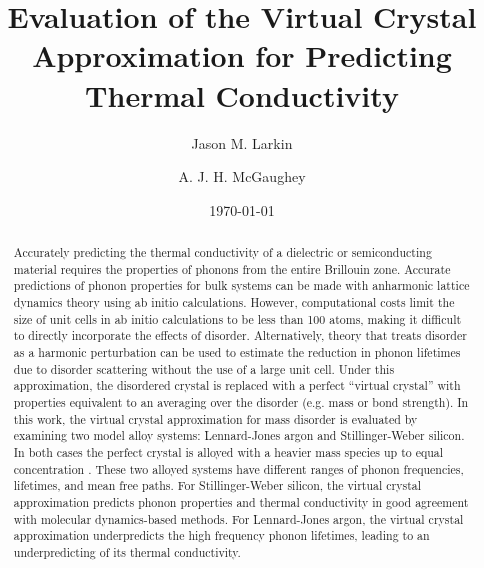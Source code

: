 \documentclass[aps,prb,twocolumn,superscriptaddress,preprintnumbers,amsmath,amssymb,floatfix]{revtex4}
\begin{document}

\title{Evaluation of the Virtual Crystal Approximation for Predicting 
Thermal Conductivity}
\author{Jason M. Larkin}
\author{A. J. H. McGaughey}

\date{\today}


\begin{abstract}
Accurately predicting the thermal conductivity of a dielectric or 
semiconducting material requires the properties of phonons from the entire 
Brillouin zone. Accurate predictions of phonon properties for bulk systems 
can be made with anharmonic lattice dynamics theory using ab initio 
calculations. However, computational costs limit the size of unit cells 
in ab initio calculations to be less than 100 atoms, making it difficult 
to directly incorporate the effects of disorder. Alternatively, theory 
that treats disorder as a harmonic perturbation can be used to estimate 
the reduction in phonon lifetimes due to disorder scattering without 
the use of a large unit cell. Under this approximation, the disordered
 crystal is replaced with a perfect “virtual crystal” with properties 
equivalent to an averaging over the disorder (e.g.  mass or bond 
strength). 
In this work, the virtual crystal approximation for mass disorder is 
evaluated by examining two model alloy systems: Lennard-Jones argon 
and Stillinger-Weber silicon. In both cases the perfect crystal is 
alloyed with a heavier mass species up to equal concentration . These 
two alloyed systems have different ranges of phonon frequencies, 
lifetimes, and mean free paths. For Stillinger-Weber silicon, the 
virtual crystal approximation predicts phonon properties and thermal 
conductivity in good agreement with molecular dynamics-based methods. 
For Lennard-Jones argon, the virtual crystal approximation underpredicts 
the high frequency phonon lifetimes, leading to an underpredicting of 
its thermal conductivity.
\end{abstract}
\end{document}

